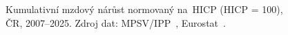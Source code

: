 \def\strStavIppKumulativCaption{\centering Kumulativní mzdový nárůst normovaný na~HICP (HICP = 100), ČR, 2007–2025. Zdroj dat: MPSV/IPP~\cite{mpsv_ipp}, Eurostat~\cite{eurostat_lci}\cite{eurostat_hicp}.}%
%
\begin{figure}[htbp]
  \centering
  \resizebox{0.95\linewidth}{!}{}
  \caption{\strStavIppKumulativCaption}
  \label{fig:stav_ipp_kumulativ}
\end{figure}

